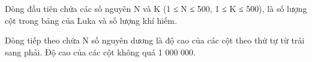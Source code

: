 Dòng đầu tiên chứa các số nguyên N và K (1 ≤ N ≤ 500, 1 ≤ K ≤ 500), là số lượng cột trong bảng của Luka và số lượng khí hiếm.  

   Dòng tiếp theo chứa N số nguyên dương là độ cao của các cột theo thứ tự từ trái sang phải. Độ cao của các cột không quá 1 000 000.  

\